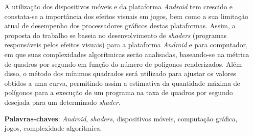 \begin{resumo}

 A utilização dos dispositivos móveis e da plataforma \textit{Android} tem crescido e constata-se a importância dos efeitos visuais em jogos, bem como a sua limitação atual de desempenho dos processadores gráficos destas plataformas. Assim, a proposta do trabalho se baseia no desenvolvimento de \textit{shaders} (programas responsáveis pelos efeitos visuais) para a plataforma \textit{Android} e para computador, em que suas complexidades algorítmicas serão analisadas, baseando-se na métrica de quadros por segundo em função do número de polígonos renderizados. Além disso, o método dos mínimos quadrados será utilizado para ajustar os valores obtidos a uma curva, permitindo assim a estimativa da quantidade máxima de polígonos para a execução de um programa na taxa de quadros por segundo desejada para um determinado \textit{shader}. 

 \vspace{\onelineskip}
    
 \noindent
 \textbf{Palavras-chaves}: \textit{Android}, \textit{shaders}, dispositivos móveis, computação gráfica, jogos, complexidade algorítmica. 
\end{resumo}
